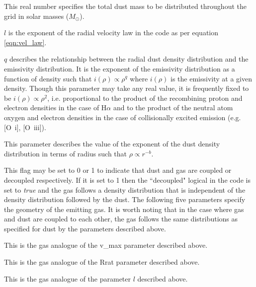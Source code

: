 
 This real number specifies the total dust mass to be distributed throughout the grid in solar masses ($M_{\odot}$).


 $l$ is the exponent of the radial velocity law in the code as per equation \ref{eqn:vel_law}.


 $q$ describes the relationship between the radial dust density distribution and the emissivity distribution.  It is the exponent of the emissivity distribution as a function of density such that $i(\rho) \propto \rho^q$ where $i(\rho)$ is the emissivity at a given density.  Though this parameter may take any real value, it is frequently fixed to be $i(\rho) \propto \rho^2$, i.e. proportional to the product of the recombining proton and electron densities in the case of H$\alpha$ and to the product of the neutral atom oxygen and electron densities in the case of collisionally excited emission (e.g. [O~{\sc i}], [O~{\sc iii}]).



 This parameter describes the value of the exponent of the dust density distribution in terms of radius such that $\rho \propto r^{-b}$.


 This flag may be set to 0 or 1 to indicate that dust and gas are coupled or decoupled respectively.  If it is set to 1 then the ``decoupled" logical in the code is set to \textit{true} and the gas follows a density distribution that is independent of the density distribution followed by the dust.  The following five parameters specify the geometry of the emitting gas.  It is worth noting that in the case where gas and dust are coupled to each other, the gas follows the same distributions as specified for dust by the parameters described above. 


 This is the gas analogue of the v\_max parameter described above.  


 This is the gas analogue of the Rrat parameter described above.  


 This is the gas analogue of the parameter $l$ described above.  

